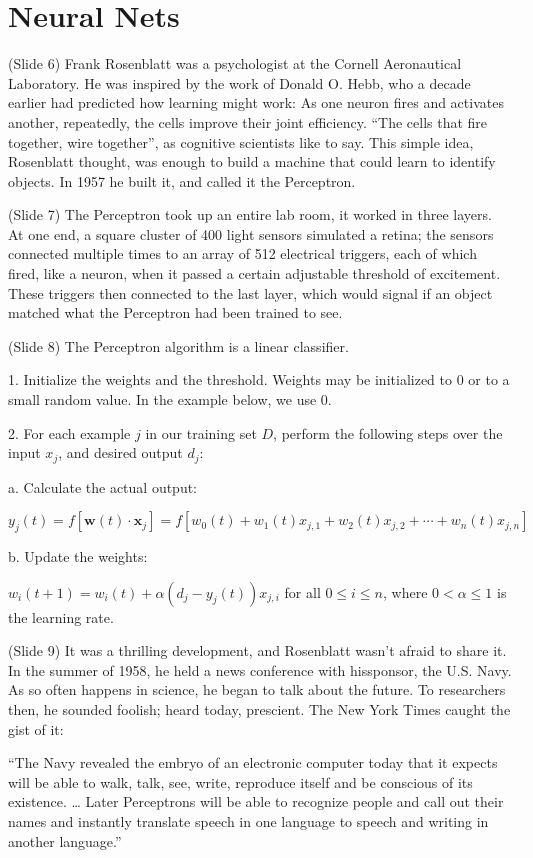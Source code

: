 \documentclass[twocolumn]{article}
\begin{document}
\section{Neural Nets}
(Slide 6) Frank Rosenblatt was a psychologist at the Cornell Aeronautical
Laboratory. He was inspired by the work of Donald O. Hebb, who a decade earlier
had predicted how learning might work: As one neuron fires and activates
another, repeatedly, the cells improve their joint efficiency. “The cells that
fire together, wire together”, as cognitive scientists like to say. This simple
idea, Rosenblatt thought, was enough to build a machine that could learn to
identify objects. In 1957 he built it, and called it the Perceptron.

(Slide 7) The Perceptron took up an entire lab room, it worked in three
layers. At one end, a square cluster of 400 light sensors simulated a retina;
the sensors connected multiple times to an array of 512 electrical triggers,
each of which fired, like a neuron, when it passed a certain adjustable
threshold of excitement. These triggers then connected to the last layer, which
would signal if an object matched what the Perceptron had been trained to see.

(Slide 8) The Perceptron algorithm is a linear classifier.

1. Initialize the weights and the threshold. Weights may be initialized to 0 or
to a small random value. In the example below, we use 0.

2. For each example \(j\) in our training set \(D\), perform the following steps
over the input \(x_{j}\), and desired output \(d_{j}\):

a. Calculate the actual output:

\(y_j(t) = f[\mathbf{w}(t)\cdot\mathbf{x}_j] = f[w_0(t) + w_1(t)x_{j,1} +
w_2(t)x_{j,2} + \dotsb + w_n(t)x_{j,n}]\)

b. Update the weights:

\(w_i(t+1) = w_i(t) + \alpha (d_j - y_j(t)) x_{j,i} \) for all \(0 \leq i \leq
n\), where \(0 < \alpha \leq 1\) is the learning rate.

(Slide 9) It was a thrilling development, and Rosenblatt wasn’t afraid to share
it. In the summer of 1958, he held a news conference with hissponsor, the
U.S. Navy. As so often happens in science, he began to talk about the future. To
researchers then, he sounded foolish; heard today, prescient. The New York Times
caught the gist of it:

“The Navy revealed the embryo of an electronic computer today that it expects
will be able to walk, talk, see, write, reproduce itself and be conscious of its
existence. … Later Perceptrons will be able to recognize people and call out
their names and instantly translate speech in one language to speech and writing
in another language.”
\end{document}
